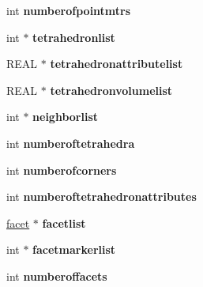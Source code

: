 \begin{DoxyCompactItemize}
\item 
\hypertarget{classtetgenio_a1a62cf8c03758eb3e1920c6c506c1a64}{int {\bfseries numberofpointmtrs}}\label{classtetgenio_a1a62cf8c03758eb3e1920c6c506c1a64}

\item 
\hypertarget{classtetgenio_ae53a07184487b2635d0f332ff818d938}{int $\ast$ {\bfseries tetrahedronlist}}\label{classtetgenio_ae53a07184487b2635d0f332ff818d938}

\item 
\hypertarget{classtetgenio_aeae735f4584f63311f1c9d46530eefe1}{R\-E\-A\-L $\ast$ {\bfseries tetrahedronattributelist}}\label{classtetgenio_aeae735f4584f63311f1c9d46530eefe1}

\item 
\hypertarget{classtetgenio_a1fe58bef7f029f7b84a8541851547382}{R\-E\-A\-L $\ast$ {\bfseries tetrahedronvolumelist}}\label{classtetgenio_a1fe58bef7f029f7b84a8541851547382}

\item 
\hypertarget{classtetgenio_ab79a85fdffb1ab3f93ff3645fb604d40}{int $\ast$ {\bfseries neighborlist}}\label{classtetgenio_ab79a85fdffb1ab3f93ff3645fb604d40}

\item 
\hypertarget{classtetgenio_ad9a3fc307214cd459ca367c55d4bc16d}{int {\bfseries numberoftetrahedra}}\label{classtetgenio_ad9a3fc307214cd459ca367c55d4bc16d}

\item 
\hypertarget{classtetgenio_a7d31410cbdcf2c1557ae7c1148c2eed7}{int {\bfseries numberofcorners}}\label{classtetgenio_a7d31410cbdcf2c1557ae7c1148c2eed7}

\item 
\hypertarget{classtetgenio_ac22e481bf9a3662b173599914a696f7a}{int {\bfseries numberoftetrahedronattributes}}\label{classtetgenio_ac22e481bf9a3662b173599914a696f7a}

\item 
\hypertarget{classtetgenio_ad65489b9aece6ba14ff8e3c89f533ced}{\hyperlink{structtetgenio_1_1facet}{facet} $\ast$ {\bfseries facetlist}}\label{classtetgenio_ad65489b9aece6ba14ff8e3c89f533ced}

\item 
\hypertarget{classtetgenio_a0d5d9d0718980f8e9d4ecc3e771abba0}{int $\ast$ {\bfseries facetmarkerlist}}\label{classtetgenio_a0d5d9d0718980f8e9d4ecc3e771abba0}

\item 
\hypertarget{classtetgenio_af1cb1515751c9cd0497abba62da8790d}{int {\bfseries numberoffacets}}\label{classtetgenio_af1cb1515751c9cd0497abba62da8790d}


\end{DoxyCompactItemize}
